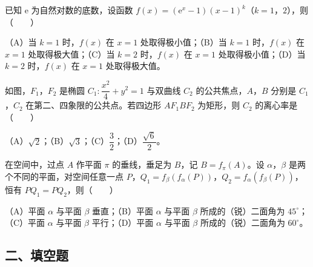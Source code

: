 \begin{question}
已知 $\mathrm e$ 为自然对数的底数，设函数 $f(x)=(\mathrm e^x-1)(x-1)^k$（$k=1$，$2$），则\mbox{（　　）}

（A）当 $k=1$ 时，$f(x)$ 在 $x=1$ 处取得极小值；（B）当 $k=1$ 时，$f(x)$ 在 $x=1$ 处取得极大值；（C）当 $k=2$ 时，$f(x)$ 在 $x=1$ 处取得极小值；（D）当 $k=2$ 时，$f(x)$ 在 $x=1$ 处取得极大值。

\Needspace{0.4\textheight}
\end{question}
\begin{question}
如图，$F_1$，$F_2$ 是椭圆 $C_1:\dfrac{x^2}4+y^2=1$ 与双曲线 $C_2$ 的公共焦点，$A$，$B$ 分别是 $C_1$，$C_2$ 在第二、四象限的公共点。若四边形 $AF_1BF_2$ 为矩形，则 $C_2$ 的离心率是\mbox{（　　）}
\nopagebreak[4]
\begin{center}\end{center}
\nopagebreak[4]
（A）$\sqrt2$；（B）$\sqrt3$；（C）$\dfrac32$；（D）$\dfrac{\sqrt6}2$。

\end{question}
\begin{question}
在空间中，过点 $A$ 作平面 $\pi$ 的垂线，垂足为 $B$，记 $B=f_\pi(A)$。设 $\alpha$，$\beta$ 是两个不同的平面，对空间任意一点 $P$，$Q_1=f_\beta(f_\alpha(P))$，$Q_2=f_\alpha(f_\beta(P))$，恒有 $PQ_1=PQ_2$，则\mbox{（　　）}

（A）平面 $\alpha$ 与平面 $\beta$ 垂直；（B）平面 $\alpha$ 与平面 $\beta$ 所成的（锐）二面角为 $45^\circ$；（C）平面 $\alpha$ 与平面 $\beta$ 平行；（D）平面 $\alpha$ 与平面 $\beta$ 所成的（锐）二面角为 $60^\circ$。

\end{question}
\begingroup
\renewcommand{\gkpart}[1]{\Needspace{0.3\textheight}\subsection*{#1}\nopagebreak}
\gkpart{二、填空题}
\endgroup

